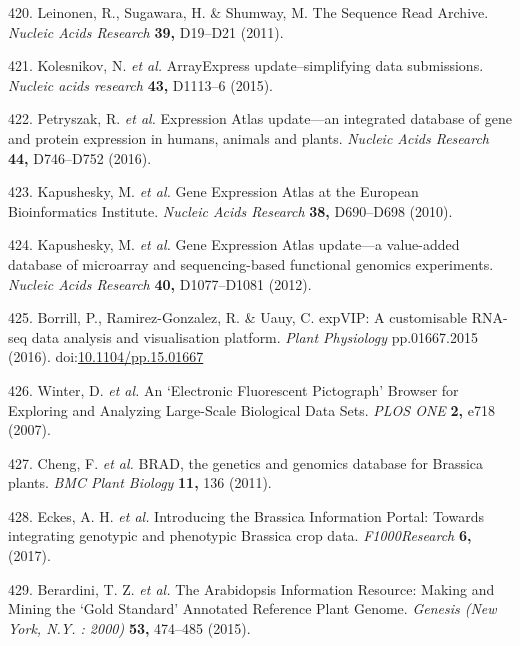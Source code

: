 \documentclass[12pt,]{book}
\begin{document}
\hypertarget{ref-leinonen_sequence_2011}{}
420. Leinonen, R., Sugawara, H. \& Shumway, M. The Sequence Read
Archive. \emph{Nucleic Acids Research} \textbf{39,} D19--D21 (2011).

\hypertarget{ref-kolesnikov_arrayexpress_2015}{}
421. Kolesnikov, N. \emph{et al.} ArrayExpress update--simplifying data
submissions. \emph{Nucleic acids research} \textbf{43,} D1113--6 (2015).

\hypertarget{ref-petryszak_expression_2016}{}
422. Petryszak, R. \emph{et al.} Expression Atlas update---an integrated
database of gene and protein expression in humans, animals and plants.
\emph{Nucleic Acids Research} \textbf{44,} D746--D752 (2016).

\hypertarget{ref-kapushesky_gene_2010}{}
423. Kapushesky, M. \emph{et al.} Gene Expression Atlas at the European
Bioinformatics Institute. \emph{Nucleic Acids Research} \textbf{38,}
D690--D698 (2010).

\hypertarget{ref-kapushesky_gene_2012}{}
424. Kapushesky, M. \emph{et al.} Gene Expression Atlas update---a
value-added database of microarray and sequencing-based functional
genomics experiments. \emph{Nucleic Acids Research} \textbf{40,}
D1077--D1081 (2012).

\hypertarget{ref-borrill_expvip_2016}{}
425. Borrill, P., Ramirez-Gonzalez, R. \& Uauy, C. expVIP: A
customisable RNA-seq data analysis and visualisation platform.
\emph{Plant Physiology} pp.01667.2015 (2016).
doi:\href{https://doi.org/10.1104/pp.15.01667}{10.1104/pp.15.01667}

\hypertarget{ref-winter_electronic_2007}{}
426. Winter, D. \emph{et al.} An `Electronic Fluorescent Pictograph'
Browser for Exploring and Analyzing Large-Scale Biological Data Sets.
\emph{PLOS ONE} \textbf{2,} e718 (2007).

\hypertarget{ref-cheng_brad_2011}{}
427. Cheng, F. \emph{et al.} BRAD, the genetics and genomics database
for Brassica plants. \emph{BMC Plant Biology} \textbf{11,} 136 (2011).

\hypertarget{ref-eckes_introducing_2017}{}
428. Eckes, A. H. \emph{et al.} Introducing the Brassica Information
Portal: Towards integrating genotypic and phenotypic Brassica crop data.
\emph{F1000Research} \textbf{6,} (2017).

\hypertarget{ref-berardini_arabidopsis_2015}{}
429. Berardini, T. Z. \emph{et al.} The Arabidopsis Information
Resource: Making and Mining the `Gold Standard' Annotated Reference
Plant Genome. \emph{Genesis (New York, N.Y. : 2000)} \textbf{53,}
474--485 (2015).
\end{document}
